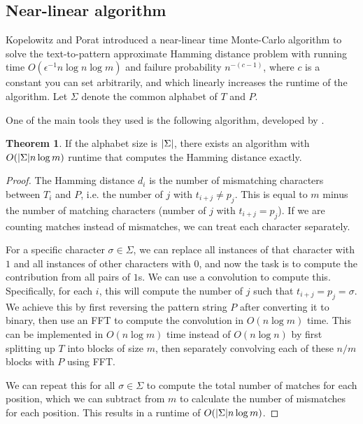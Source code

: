 \documentclass{article}
\theoremstyle{definition}
\newtheorem{theorem}{Theorem}[section]
\newcommand{\eps}{\epsilon}
\DeclarePairedDelimiter{\abs}{\lvert}{\rvert}
\begin{document}
\subsection{Near-linear algorithm}

Kopelowitz and Porat \cite{kopelowitz18} introduced a near-linear time Monte-Carlo algorithm to solve the text-to-pattern approximate Hamming distance problem with running time $O(\eps^{-1} n \log n \log m)$ and failure probability $n^{-(c-1)}$, where $c$ is a constant you can set arbitrarily, and which linearly increases the runtime of the algorithm.
Let $\Sigma$ denote the common alphabet of $T$ and $P$.

One of the main tools they used is the following algorithm, developed by \cite{fischer74}.

\begin{theorem} \label{thm:sigma_fft}
    If the alphabet size is $\abs{\Sigma}$, there exists an algorithm with $O(\abs{\Sigma} n \log m)$ runtime that computes the Hamming distance exactly.
\end{theorem}
\begin{proof}
    The Hamming distance $d_i$ is the number of mismatching characters between $T_i$ and $P$, i.e. the number of $j$ with $t_{i+j} \neq p_j$.
    This is equal to $m$ minus the number of matching characters (number of $j$ with $t_{i+j} = p_j$).
    If we are counting matches instead of mismatches, we can treat each character separately.

    For a specific character $\sigma \in \Sigma$, we can replace all instances of that character with $1$ and all instances of other characters with $0$, and now the task is to compute the contribution from all pairs of $1$s. 
    We can use a convolution to compute this.
    Specifically, for each $i$, this will compute the number of $j$ such that $t_{i+j} = p_j = \sigma$.
    We achieve this by first reversing the pattern string $P$ after converting it to binary, then use an FFT to compute the convolution in $O(n \log m)$ time.
    This can be implemented in $O(n \log m)$ time instead of $O(n \log n)$ by first splitting up $T$ into blocks of size $m$, then separately convolving each of these $n/m$ blocks with $P$ using FFT.

    We can repeat this for all $\sigma \in \Sigma$ to compute the total number of matches for each position, which we can subtract from $m$ to calculate the number of mismatches for each position.
    This results in a runtime of $O(\abs{\Sigma} n \log m)$.
\end{proof}
\end{document}
